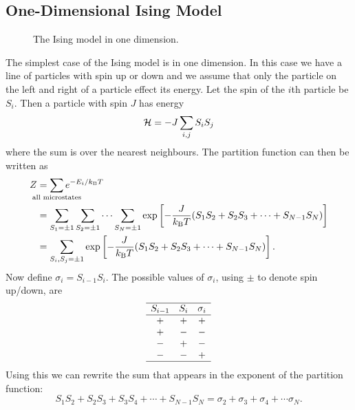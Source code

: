 \documentclass[a4paper]{article}
\newcommand{\boltzmann}{k_\mathrm{B}}
\begin{document}
    \subsection{One-Dimensional Ising Model}
    \begin{figure}
        \centering
        \caption{The Ising model in one dimension.}
    \end{figure}
    The simplest case of the Ising model is in one dimension.
    In this case we have a line of particles with spin up or down and we assume that only the particle on the left and right of a particle effect its energy.
    Let the spin of the \(i\)th particle be \(S_i\).
    Then a particle with spin \(J\) has energy
    \[\mathcal{H} = -J\sum_{i,j}S_iS_j\]
    where the sum is over the nearest neighbours.
    The partition function can then be written as
    \begin{align*}
        Z &= \sum_{\mathclap{\text{all microstates}}} e^{-E_i/\boltzmann T}\\
        &= \sum_{S_1=\pm 1}\sum_{S_2=\pm 1}\dotsb\sum_{S_N=\pm 1} \exp\left[-\frac{J}{\boltzmann T}(S_1S_2 + S_2S_3 + \dotsb + S_{N-1}S_N)\right]\\
        &= \sum_{S_i, S_j=\pm 1} \exp\left[-\frac{J}{\boltzmann T}(S_1S_2 + S_2S_3 + \dotsb + S_{N-1}S_N)\right].
    \end{align*}
    Now define \(\sigma_{i} = S_{i-1}S_{i}\).
    The possible values of \(\sigma_i\), using \(\pm\) to denote spin up/down, are
    \[
    \begin{array}{ccc}\hline
        S_{i-1} & S_i & \sigma_i\\\hline
        + & + & +\\
        + & - & -\\
        - & + & -\\
        - & - & +\\\hline
    \end{array}
    \]
    Using this we can rewrite the sum that appears in the exponent of the partition function:
    \[S_1S_2 + S_2S_3 + S_3S_4 + \dotsb + S_{N-1}S_N = \sigma_{2} + \sigma_3 + \sigma_4 + \dotsb \sigma_{N}.\]
\end{document}
